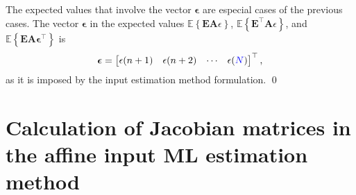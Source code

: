 \begin{pf}
The expected values that involve the vector $\bm{\epsilon}$ are especial cases of the previous cases. 
The vector $\bm{\epsilon}$ in the expected values $\mathbb{E} \left\{ \mathbf{E} \mathbf{A} \epsilon \right\}$, $\mathbb{E} \left\{ \mathbf{E}^\top \mathbf{A} \epsilon \right\}$, and $\mathbb{E} \left\{ \mathbf{E} \mathbf{A} \bm{\epsilon}^\top \right\}$ is
\begin{equation} \bm{\epsilon} = \begin{bmatrix} \epsilon(n+1) & \epsilon(n+2) & \cdots & \epsilon(\color{blue}N\color{black}) \end{bmatrix}^\top, \end{equation}
as it is imposed by the input estimation method formulation.
\qed \end{pf}


\section[Calculation of Jacobian matrices in the affine input ML estimation method]{Calculation of Jacobian matrices \linebreak in the affine input ML estimation method \label{appendix:Jacobians} }

